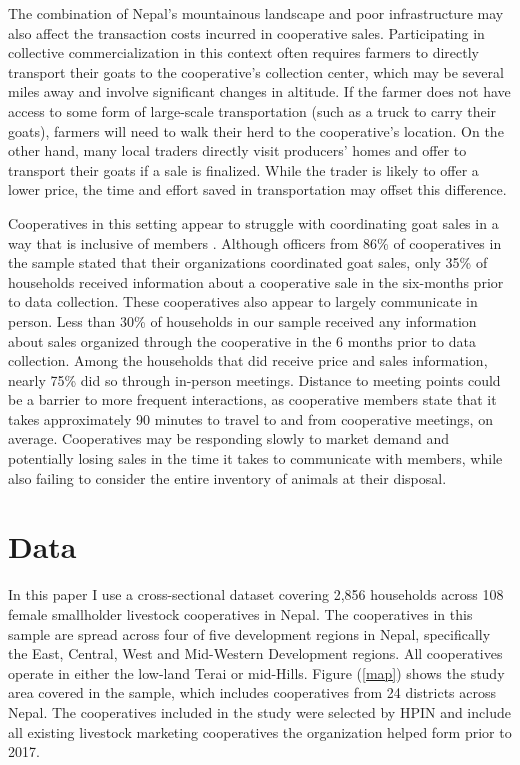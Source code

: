 \documentclass[11pt]{article}
\begin{document}
The combination of Nepal's mountainous landscape and poor infrastructure may also affect the transaction costs incurred in cooperative sales. Participating in collective commercialization in this context often requires farmers to directly transport their goats to the cooperative's collection center, which may be several miles away and involve significant changes in altitude. If the farmer does not have access to some form of large-scale transportation (such as a truck to carry their goats), farmers will need to walk their herd to the cooperative's location. On the other hand, many local traders directly visit producers' homes and offer to transport their goats if a sale is finalized. While the trader is likely to offer a lower price, the time and effort saved in transportation may offset this difference.

Cooperatives in this setting appear to struggle with coordinating goat sales in a way that is inclusive of members \citep{mullally_impact_2020}. Although officers from 86\% of cooperatives in the sample stated that their organizations coordinated goat sales, only 35\% of households received information about a cooperative sale in the six-months prior to data collection. These cooperatives also appear to largely communicate in person. Less than 30\% of households in our sample received any information about sales organized through the cooperative in the 6 months prior to data collection. Among the households that did receive price and sales information, nearly 75\% did so through in-person meetings. Distance to meeting points could be a barrier to more frequent interactions, as cooperative members state that it takes approximately 90 minutes to travel to and from cooperative meetings, on average. Cooperatives may be responding slowly to market demand and potentially losing sales in the time it takes to communicate with members, while also failing to consider the entire inventory of animals at their disposal.

\section{Data} \label{sec:data}
In this paper I use a cross-sectional dataset covering 2,856 households across 108 female smallholder livestock cooperatives in Nepal. The cooperatives in this sample are spread across four of five development regions in Nepal, specifically the East, Central, West and Mid-Western Development regions. All cooperatives operate in either the low-land Terai or mid-Hills. Figure (\ref{map}) shows the study area covered in the sample, which includes cooperatives from 24 districts across Nepal. The cooperatives included in the study were selected by HPIN and include all existing livestock marketing cooperatives the organization helped form prior to 2017.
\end{document}
